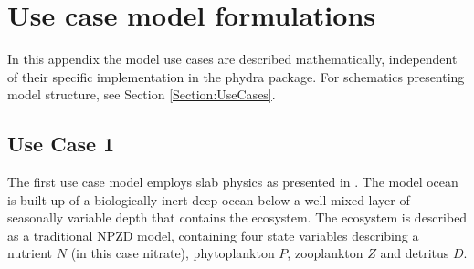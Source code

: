 \documentclass[template.tex]{subfiles}
\begin{document}
\section{Use case model formulations}

\begin{comment}
Note: to allow for an intuitive depiction of multiple instances of each parameter and state variable, modifying subscripts in symbols are instead added as a superscript (e.g. $\gamma^{N}$ for the nutrient-limitation of phytoplankton growth) so that indices in the subscript signify the dimensionality of symbols (e.g. $\gamma^{N}_i$ for the term per individual phytoplankton state variable $i$). This finds no usage in use case 1, but in both 2 and 3.
Overall I attempted to make the presentation of symbols and equations coherent between use cases.
\end{comment}

In this appendix the model use cases are described mathematically, independent of their specific implementation in the phydra package. For schematics presenting model structure, see Section \ref{Section:UseCases}.

\subsection{Use Case 1}

The first use case model employs slab physics as presented in \citet{Evans1985ACycles}. The model ocean is built up of a biologically inert deep ocean below a well mixed layer of seasonally variable depth that contains the ecosystem. The ecosystem is described as a traditional NPZD model, containing four state variables describing a nutrient $N$ (in this case nitrate), phytoplankton $P$, zooplankton $Z$ and detritus $D$.
\end{document}

